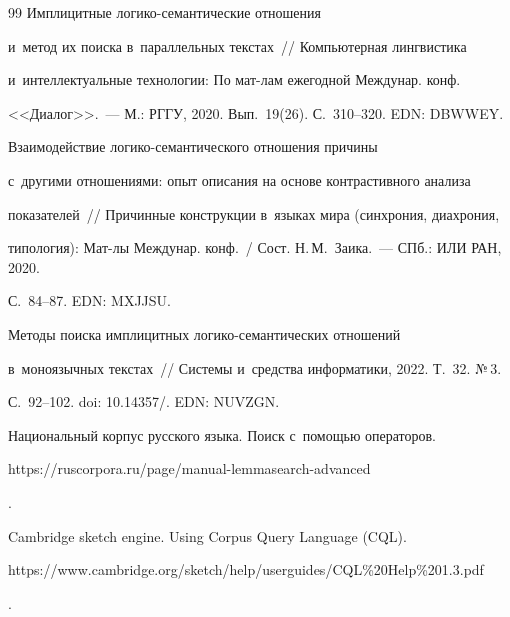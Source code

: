 {{\begin{thebibliography}{99}
 Имплицитные ло\-ги\-ко-се\-ман\-ти\-че\-ские отношения 


и~метод их поиска в~параллельных текстах~/\!\!/ Компьютерная лингвистика 


и~интеллектуальные технологии: По мат-лам ежегодной Междунар. конф.  


<<Диалог>>.~--- М.: РГГУ, 2020. Вып.~19(26). С.~310--320. EDN: DBWWEY.







 Взаимодействие ло\-ги\-ко-се\-ман\-ти\-че\-ско\-го отношения причины 


с~другими отношениями: опыт описания на основе контрастивного анализа 


показателей~/\!\!/ Причинные конструкции в~языках мира (синхрония, диахрония, 


типология): Мат-лы Междунар. конф.~/ Сост. Н.\,М.~Заика.~--- СПб.: ИЛИ РАН, 2020. 


С.~84--87. EDN: MXJJSU.







 Методы поиска имплицитных ло\-ги\-ко-се\-ман\-ти\-че\-ских отношений 


в~моноязычных текс\-тах~/\!\!/ Сис\-те\-мы и~средства информатики, 2022. Т.~32. №\,3.  


С.~92--102. doi: 10.14357\!/. EDN: NUVZGN.




Национальный корпус русского языка. Поиск с~помощью операторов. {\sf 


https://ruscorpora.ru/page/manual-lemmasearch-advanced}.




Cambridge sketch engine. Using Corpus Query Language (CQL). {\sf 


https://www.\linebreak cambridge.org/sketch/help/userguides/CQL\%20Help\%201.3.pdf}.





   \end{thebibliography}


} }











